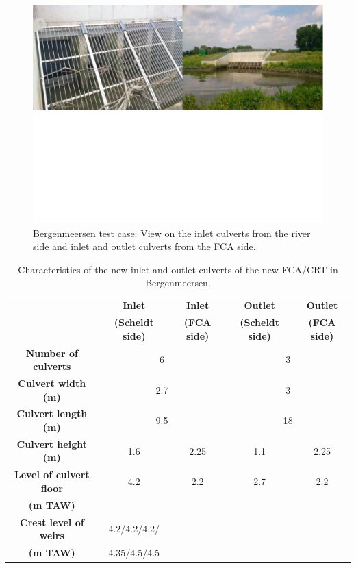 \begin{figure}[H]
\begin{center}
  \includegraphics[scale=0.5, trim = 0 300 0 0, clip]{figure3.png}
\end{center}
\caption{Bergenmeersen test case: View on the inlet culverts from the river side and inlet and outlet culverts from the FCA side.}
\label{fig:bergenmeersen_figure3}
\end{figure}

\begin{table}[H]
\caption{Characteristics of the new inlet and outlet culverts of the new 
FCA/CRT in Bergenmeersen.}\label{tab:bergenmeersen_table1}
\begin{center}\begin{tabular}{|c|c|c|c|c|}
\hline
~ & \textbf{Inlet} & \textbf{Inlet} & \textbf{Outlet} & \textbf{Outlet}\\
~ & \textbf{(Scheldt side)} & \textbf{(FCA side)} & \textbf{(Scheldt side)} & \textbf{(FCA side)}\\
\hline
\textbf{Number of culverts} & \multicolumn{2}{c|}{6} & \multicolumn{2}{c|}{3} \\
\hline
\textbf{Culvert width (m)} & \multicolumn{2}{c|}{2.7} & \multicolumn{2}{c|}{3} \\
\hline
\textbf{Culvert length (m)} & \multicolumn{2}{c|}{9.5} & \multicolumn{2}{c|}{18} \\
\hline
\textbf{Culvert height (m)} & 1.6 & 2.25 & 1.1 & 2.25\\
\hline
\textbf{Level of culvert floor} & 4.2 & 2.2 & 2.7 & 2.2\\
\textbf{(m TAW)} & ~ & ~ & ~ & ~\\
\hline
\textbf{Crest level of weirs} & 4.2/4.2/4.2/ & ~ & ~ & ~ \\
\textbf{(m TAW)} & 4.35/4.5/4.5 & ~ & ~ & ~ \\
\hline
\end{tabular}\end{center}
\end{table}
%
